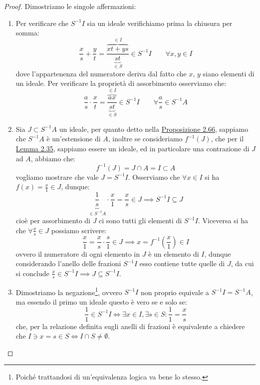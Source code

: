 \documentclass[11pt]{scrartcl}
\begin{document}
\begin{proof}
    Dimostriamo le singole affermazioni:
    \begin{enumerate}[(1)]
        \item Per verificare che $S^{-1}I$ sia un ideale verifichiamo prima la chiusura per somma:
            \[ \frac{x}{s} + \frac{y}{t} = \frac{\overbrace{xt + ys}^{\in I}}{\underbrace{st}_{\in S}} \in S^{-1}I \qquad \forall x,y \in I
                \]
            dove l'appartenenza del numeratore deriva dal fatto che $x$, $y$ siano elementi di un ideale. Per verificare la proprietà di assorbimento osserviamo che:
            \[ \frac{a}{s} \cdot \frac{x}{t} = \frac{\overbrace{ax}^{\in I}}{\underbrace{st}_{\in S}} \in S^{-1}I \qquad \forall \frac{a}{s} \in S^{-1}A 
                 \]
        \item Sia $J \subset S^{-1}A$ un ideale, per quanto detto nella \hyperref[2.66]{Proposizione 2.66}, sappiamo che $S^{-1}A$ è un'estensione di $A$, inoltre se consideriamo $f^{-1}(J)$, che per il \hyperref[2.35]{Lemma 2.35}, 
            sappiamo essere un ideale, ed in particolare una contrazione di $J$ ad $A$, abbiamo che:
            \[ f^{-1}(J) = J \cap A = I \subset A
                \]
            vogliamo mostrare che vale $J = S^{-1}I$. Osserviamo che $\forall x \in I$ si ha $\displaystyle f(x) = \frac{x}{1} \in J$, dunque:
            \[ \underbrace{\frac{1}{s}}_{\in S^{-1}A} \cdot \frac{x}{1} = \frac{x}{s} \in J \implies S^{-1}I \subseteq J
                \]
            cioè per assorbimento di $J$ ci sono tutti gli elementi di $S^{-1}I$. Viceversa si ha che $\displaystyle\forall \frac{x}{s} \in J$ possiamo scrivere:
            \[ \frac{x}{1} = \frac{x}{s}\cdot \frac{s}{1} \in J \implies x = f^{-1}\left(\frac{x}{1}\right) \in I
                \]
            ovvero il numeratore di ogni elemento in $J$ è un elemento di $I$, dunque considerando l'anello delle frazioni $S^{-1}I$ esso contiene tutte quelle di $J$, da cui si conclude $\displaystyle \frac{x}{s} \in S^{-1}I \implies J \subseteq S^{-1}I$.
        \item Dimostriamo la negazione\footnote{Poiché trattandosi di un'equivalenza logica va bene lo stesso.}, ovvero $S^{-1}I$ non proprio equivale a $S^{-1}I = S^{-1}A$, ma essendo il primo un ideale questo è vero se e solo se:
            \[ \frac{1}{1} \in S^{-1}I \iff \exists x \in I, \exists s \in S : \frac{1}{1} = \frac{x}{s}
                \]
            che, per la relazione definita sugli anelli di frazioni è equivalente a chiedere che $I \ni x = s \in S \iff I \cap S \ne \emptyset$.

\end{enumerate}
\end{proof}
\end{document}
